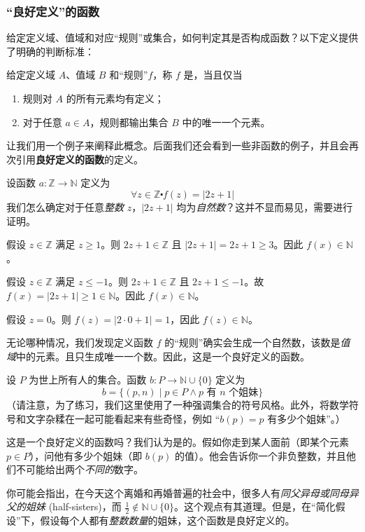 \subsubsection*{``良好定义''的函数}

给定定义域、值域和对应``规则''或集合，如何判定其是否构成函数？以下定义提供了明确的判断标准：

\begin{definition}\label{def:definition7.2.5}
    给定定义域 $A$、值域 $B$ 和``规则''$f$，称 $f$ 是，当且仅当
    \begin{enumerate}[label=(\arabic*)]
        \item 规则对 $A$ 的所有元素均有定义；
        \item 对于任意 $a \in A$，规则都输出集合 $B$ 中的唯一一个元素。
    \end{enumerate}
\end{definition}

让我们用一个例子来阐释此概念。后面我们还会看到一些非函数的例子，并且会再次引用\textbf{良好定义的函数}的定义。

\begin{example}
    设函数 $a : \mathbb{Z} \to \mathbb{N}$ 定义为
    \[\forall z \in \mathbb{Z} \centerdot f(z) = |2z + 1|\]
    我们怎么确定对于任意\emph{整数} $z$，$|2z + 1|$ 均为\emph{自然数}？这并不显而易见，需要进行证明。

    假设 $z \in \mathbb{Z}$ 满足 $z \ge 1$。则 $2z+1 \in \mathbb{Z}$ 且 $|2z+1| = 2z+1 \ge 3$。因此 $f(x) \in \mathbb{N}$。

    假设 $z \in \mathbb{Z}$ 满足 $z \le -1$。则 $2z+1 \in \mathbb{Z}$ 且 $2z+1 \le -1$。故 $f(x) = |2z + 1| \ge 1 \in \mathbb{N}$。因此 $f(x) \in \mathbb{N}$。

    假设 $z = 0$。则 $f(z) = |2 \cdot 0 + 1| = 1$，因此 $f(z) \in \mathbb{N}$。

    无论哪种情况，我们发现定义函数 $f$ 的``规则''确实会生成一个自然数，该数是\emph{值域}中的元素。且只生成唯一一个数。因此，这是一个良好定义的函数。
\end{example}

\begin{example}
    设 $P$ 为世上所有人的集合。函数 $b : P \to \mathbb{N} \cup \{0\}$ 定义为
    \[b = \{(p, n) \mid p \in P \land p \text{\ 有\ } n \text{\ 个姐妹}\}\]
    （请注意，为了练习，我们这里使用了一种强调集合的符号风格。此外，将数学符号和文字杂糅在一起可能看起来有些奇怪，例如 ``$b(p) = p \text{\ 有多少个姐妹}$''。）

    这是一个良好定义的函数吗？我们认为是的。假如你走到某人面前（即某个元素 $p \in P$），问他有多少个姐妹（即 $b(p)$ 的值）。他会告诉你一个非负整数，并且他们不可能给出两个\emph{不同的}数字。

    你可能会指出，在今天这个离婚和再婚普遍的社会中，很多人有\emph{同父异母或同母异父的姐妹} (half-sisters)，而 $\frac{1}{2} \notin \mathbb{N} \cup \{0\}$。这个观点有其道理。但是，在``简化假设''下，假设每个人都有\emph{整数数量}的姐妹，这个函数是良好定义的。
\end{example}

